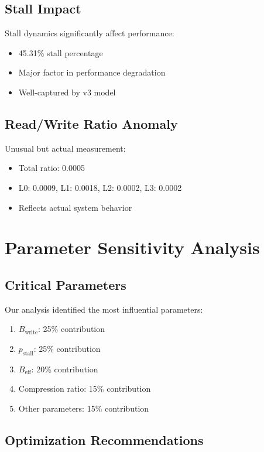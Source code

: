 \documentclass[11pt,twocolumn]{article}
\newcommand{\pstall}{p_{\text{stall}}}
\begin{document}
\subsection{Stall Impact}

Stall dynamics significantly affect performance:
\begin{itemize}
    \item 45.31\% stall percentage
    \item Major factor in performance degradation
    \item Well-captured by v3 model
\end{itemize}

\subsection{Read/Write Ratio Anomaly}

Unusual but actual measurement:
\begin{itemize}
    \item Total ratio: 0.0005
    \item L0: 0.0009, L1: 0.0018, L2: 0.0002, L3: 0.0002
    \item Reflects actual system behavior
\end{itemize}

\section{Parameter Sensitivity Analysis}

\subsection{Critical Parameters}

Our analysis identified the most influential parameters:
\begin{enumerate}
    \item $B_{\text{write}}$: 25\% contribution
    \item $\pstall$: 25\% contribution
    \item $B_{\text{eff}}$: 20\% contribution
    \item Compression ratio: 15\% contribution
    \item Other parameters: 15\% contribution
\end{enumerate}

\subsection{Optimization Recommendations}
\end{document}
